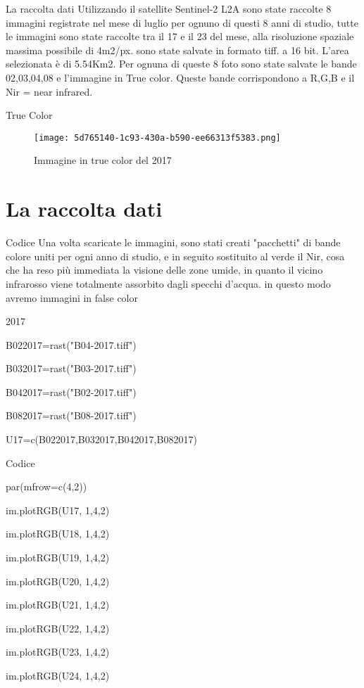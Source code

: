 \documentclass{beamer} %
\begin{document}
        \begin{frame}{ La raccolta dati}
           Utilizzando il satellite Sentinel-2 L2A sono state raccolte 8 immagini registrate nel mese di luglio per ognuno di questi 8 anni di studio, tutte le immagini sono state raccolte tra il 17 e il 23 del mese, alla risoluzione spaziale massima possibile di 4m2/px. sono state salvate in formato tiff. a 16 bit. L'area selezionata è di 5.54Km2. Per ognuna di queste 8 foto sono state salvate le bande 02,03,04,08 e l'immagine in True color.
           Queste bande corrispondono a R,G,B e il Nir = near infrared. 
        \end{frame}
        \begin{frame}{True Color}
\begin{figure}
    \centering
    \texttt{[image: 5d765140-1c93-430a-b590-ee66313f5383.png]}
    \caption{Immagine in true color del 2017}
    \label{fig:enter-label}
\end{figure}
                \end{frame}\section{La raccolta dati}

        \begin{frame}{Codice}
           Una volta scaricate le immagini, sono stati creati "pacchetti" di bande colore uniti per ogni anno di studio, e in seguito sostituito al verde il Nir, cosa che ha reso più immediata la visione delle zone umide, in quanto il vicino infrarosso viene totalmente assorbito dagli specchi d'acqua. in questo modo avremo immagini in false color
          
             2017
           
           B022017=rast("B04-2017.tiff")
           
           B032017=rast("B03-2017.tiff")
           
           B042017=rast("B02-2017.tiff")
           
           B082017=rast("B08-2017.tiff")
           
           U17=c(B022017,B032017,B042017,B082017)
        
        \end{frame}
        
        \begin{frame}{Codice}
            
             par(mfrow=c(4,2))
 
im.plotRGB(U17, 1,4,2)

im.plotRGB(U18, 1,4,2)

im.plotRGB(U19, 1,4,2)

im.plotRGB(U20, 1,4,2)

im.plotRGB(U21, 1,4,2)

im.plotRGB(U22, 1,4,2)

im.plotRGB(U23, 1,4,2)

im.plotRGB(U24, 1,4,2)
        \end{frame}
      
\end{document}
